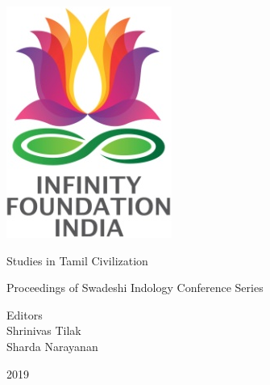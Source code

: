 \thispagestyle{empty}

\includegraphics{"images/logo.png"}

Studies in Tamil Civilization


Proceedings of Swadeshi Indology Conference Series

Editors\\Shrinivas Tilak\\Sharda Narayanan


2019

